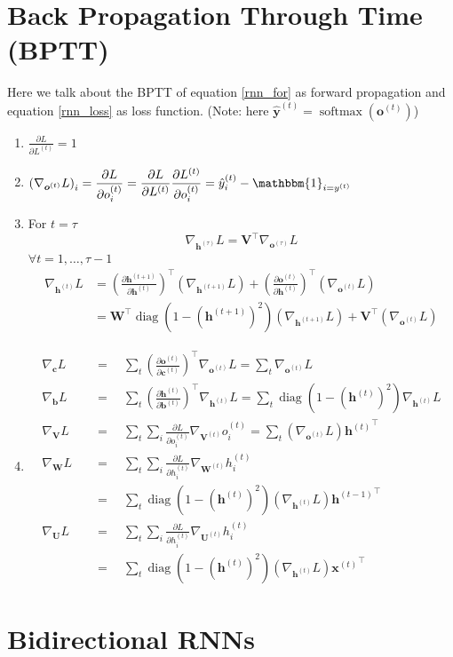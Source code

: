 \documentclass[12pt, a4paper]{article}
\def\vb{\boldsymbol{b}}
\def\vc{\boldsymbol{c}}
\def\vU{\boldsymbol{U}}
\def\vV{\boldsymbol{V}}
\def\vW{\boldsymbol{W}}
\DeclareMathOperator*{\softmax}{softmax}
\DeclareMathOperator*{\diag}{diag}
\newcommand{\egvb}[1]{\boldsymbol{b}^{(#1)}}
\newcommand{\egvc}[1]{\boldsymbol{c}^{(#1)}}
\newcommand{\egvh}[1]{\boldsymbol{h}^{(#1)}}
\newcommand{\egvo}[1]{\boldsymbol{o}^{(#1)}}
\newcommand{\egvx}[1]{\boldsymbol{x}^{(#1)}}
\newcommand{\egvU}[1]{\boldsymbol{U}^{(#1)}}
\newcommand{\egvV}[1]{\boldsymbol{V}^{(#1)}}
\newcommand{\egvW}[1]{\boldsymbol{W}^{(#1)}}
\newcommand{\egh}[1]{h^{(#1)}}
\newcommand{\ego}[1]{o^{(#1)}}
\newcommand{\egy}[1]{y^{(#1)}}
\newcommand{\egL}[1]{L^{(#1)}}
\newcommand{\eghy}[1]{\hat{y}^{(#1)}}
\newcommand{\eghvy}[1]{\hat{\boldsymbol{y}}^{(#1)}}
\newcommand{\pard}[2]{\frac{\partial #1}{\partial #2}}
\newcommand{\tpard}[2]{\left(\frac{\partial #1}{\partial #2}\right)^\top}
\begin{document}
\section{Back Propagation Through Time (BPTT)}
Here we talk about the BPTT of equation \ref{rnn_for} as forward propagation and equation \ref{rnn_loss} as loss function.
(Note: here $\eghvy{t} = \softmax(\egvo{t})$)
\begin{enumerate}
    \item $\displaystyle \pard{L}{\egL{t}} = 1$
    \item $\displaystyle \left( \nabla_{\egvo{t}} L \right)_i 
        = \pard{L}{\ego{t}_i} 
        = \pard{L}{\egL{t}} \pard{\egL{t}}{\ego{t}_i} 
        = \eghy{t}_i - \mathbbm{1}_{i=\egy{t}}$
    \item For $t=\tau$
        \[
            \nabla_{\egvh{\tau}}L = \vV^\top \nabla_{\egvo{\tau}} L  
        \]
        $\forall t = 1,\dots,\tau-1$
        \[
            \begin{split}
                \nabla_{\egvh{t}}L 
                &= \left( \pard{\egvh{t+1}}{\egvh{t}} \right)^\top (\nabla_{\egvh{t+1}}L) 
                + \left( \pard{\egvo{t}}{\egvh{t}} \right)^\top (\nabla_{\egvo{t}}L)
                \\&= \vW^\top \diag\left( 1-\left(\egvh{t+1}\right)^2 \right)(\nabla_{\egvh{t+1}}L) + \vV^\top(\nabla_{\egvo{t}}L)
            \end{split}
        \]
    \item
        \[
            \begin{split}
                \nabla_{\vc}L &\quad=\quad \sum_t\tpard{\egvo{t}}{\egvc{t}} \nabla_{\egvo{t}}L = \sum_t \nabla_{\egvo{t}}L
                \\ \nabla_{\vb}L &\quad=\quad \sum_t\tpard{\egvh{t}}{\egvb{t}} \nabla_{\egvh{t}}L = \sum_t \diag\left(1-\left(\egvh{t}\right)^2\right) \nabla_{\egvh{t}} L
                \\ \nabla_{\vV}L &\quad=\quad \sum_t\sum_i \pard{L}{\ego{t}_i} \nabla_{\egvV{t}} \ego{t}_i = \sum_t (\nabla_{\egvo{t}}L) {\egvh{t}}^\top
                \\ \nabla_{\vW}L &\quad=\quad \sum_t\sum_i \pard{L}{\egh{t}_i} \nabla_{\egvW{t}}\egh{t}_i
                \\&\quad=\quad \sum_t \diag\left(1 - \left(\egvh{t}\right)^2\right) (\nabla_{\egvh{t}} L) {\egvh{t-1}}^\top
                \\ \nabla_{\vU}L &\quad=\quad \sum_t\sum_i \pard{L}{\egh{t}_i} \nabla_{\egvU{t}}\egh{t}_i
                \\&\quad=\quad \sum_t \diag\left(1 - \left(\egvh{t}\right)^2\right) (\nabla_{\egvh{t}} L) {\egvx{t}}^\top
            \end{split}
        \]
\end{enumerate}


\section{Bidirectional RNNs}
\end{document}
